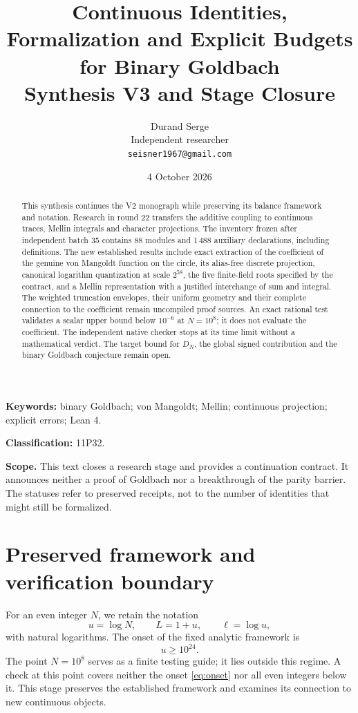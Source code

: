 \documentclass[11pt,a4paper]{article}
\title{Continuous Identities, Formalization and Explicit Budgets\\
for Binary Goldbach\\[5pt]\large Synthesis V3 and Stage Closure}
\author{Durand Serge\\\small Independent researcher\\\small\texttt{seisner1967@gmail.com}}
\date{4 October 2026}
\theoremstyle{remark}
\begin{document}
\maketitle
\begin{abstract}
This synthesis continues the V2 monograph while preserving its balance
framework and notation. Research in round 22 transfers the additive coupling
to continuous traces, Mellin integrals and character projections.
The inventory frozen after independent batch 35 contains 88 modules and
1\,488 auxiliary declarations, including definitions. The new established
results include exact extraction of the coefficient of the genuine von
Mangoldt function on the circle, its alias-free discrete projection, canonical
logarithm quantization at scale $2^{58}$, the five finite-field roots specified
by the contract, and a Mellin representation with a justified interchange
of sum and integral. The weighted truncation envelopes, their uniform geometry
and their complete connection to the coefficient remain uncompiled proof
sources. An exact rational test validates a scalar upper bound below $10^{-6}$
at $N=10^8$; it does not evaluate the coefficient. The independent native
checker stops at its time limit without a mathematical verdict.
The target bound for $D_N$, the global signed contribution and the binary
Goldbach conjecture remain open.
\end{abstract}
\noindent\textbf{Keywords:} binary Goldbach; von Mangoldt; Mellin;
continuous projection; explicit errors; Lean 4.
\par\noindent\textbf{Classification:} 11P32.
\par\noindent\textbf{Scope.} This text closes a research stage and provides
a continuation contract. It announces neither a proof of Goldbach nor a
breakthrough of the parity barrier. The statuses refer to preserved receipts,
not to the number of identities that might still be formalized.
\par{}

\clearpage
\section{Preserved framework and verification boundary}\label{sec:frame}
For an even integer $N$, we retain the notation
\[
u=\log N,\qquad L=1+u,\qquad \ell=\log u,
\]
with natural logarithms. The onset of the fixed analytic framework is
\begin{equation}\label{eq:onset}
u\ge 10^{24}.
\end{equation}
The point $N=10^8$ serves as a finite testing guide; it lies outside this regime.
A check at this point covers neither the onset \eqref{eq:onset} nor all even
integers below it. This stage preserves the established framework and examines
its connection to new continuous objects.
\end{document}
